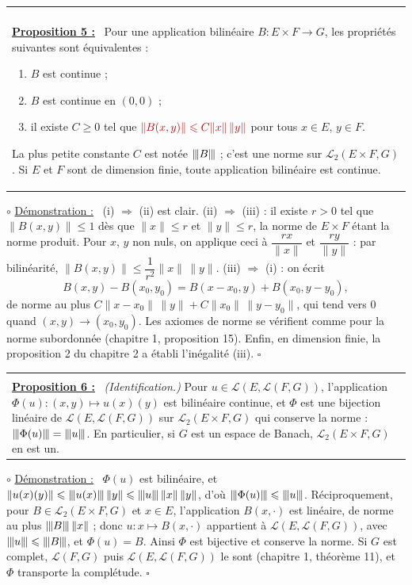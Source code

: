 \documentclass[a4paper,twoside]{report}
\makeatletter
\newcommand{\rmath}[1]{\textcolor{rougecours}{#1}}
\newenvironment{cadre}%
 {\par\vspace{2mm}\noindent\begin{tabular}{|@{\hspace{4mm}}p{0.93\textwidth}@{\hspace{4mm}}|}
  \hline \\[-2mm]}%
 {\\[2mm] \hline \end{tabular}\par\vspace{3mm}}
\newcommand{\propo}[1]{\textbf{\underline{Proposition #1 :}}~}
\newenvironment{demo}%
 {\par\needspace{4\baselineskip}\vspace{1mm}\noindent$\circ$ \underline{Démonstration :}~\setlength{\parskip}{3pt plus 1pt}}%
 {\hfill$\square$\par\vspace{2mm}}
\newcommand{\norme}[1]{\lVert #1 \rVert}         %
\newcommand{\nop}[1]{|\mkern-1.5mu|\mkern-1.5mu|#1|\mkern-1.5mu|\mkern-1.5mu|}   %
\newcommand{\Lc}{\mathcal{L}}                     %
\makeatother
\begin{document}
\begin{cadre}
\propo{5} Pour une application bilinéaire $B : E \times F \to G$, les propriétés suivantes sont équivalentes :
\begin{enumerate}[label=(\roman*),topsep=3pt,itemsep=2pt]
  \item $B$ est continue ;
  \item $B$ est continue en $(0, 0)$ ;
  \item il existe $C \geqslant 0$ tel que $\rmath{\norme{B(x, y)} \leqslant C\norme{x}\,\norme{y}}$ pour tous $x \in E$, $y \in F$.
\end{enumerate}
La plus petite constante $C$ est notée $\nop{B}$ ; c'est une norme sur $\Lc_{2}(E \times F, G)$. Si $E$ et $F$ sont de dimension finie, toute application bilinéaire est continue.
\end{cadre}

\begin{demo}
(i) $\Rightarrow$ (ii) est clair. (ii) $\Rightarrow$ (iii) : il existe $r > 0$ tel que $\norme{B(x, y)} \leqslant 1$ dès que $\norme{x} \leqslant r$ et $\norme{y} \leqslant r$, la norme de $E \times F$ étant la norme produit. Pour $x$, $y$ non nuls, on applique ceci à $\dfrac{rx}{\norme{x}}$ et $\dfrac{ry}{\norme{y}}$ : par bilinéarité, $\norme{B(x, y)} \leqslant \dfrac{1}{r^{2}}\norme{x}\,\norme{y}$. (iii) $\Rightarrow$ (i) : on écrit
\[ B(x, y) - B(x_{0}, y_{0}) = B(x - x_{0}, y) + B(x_{0}, y - y_{0}), \]
de norme au plus $C\norme{x - x_{0}}\,\norme{y} + C\norme{x_{0}}\,\norme{y - y_{0}}$, qui tend vers $0$ quand $(x, y) \to (x_{0}, y_{0})$. Les axiomes de norme se vérifient comme pour la norme subordonnée (chapitre 1, proposition 15). Enfin, en dimension finie, la proposition 2 du chapitre 2 a établi l'inégalité (iii).
\end{demo}

\begin{cadre}
\propo{6} \emph{(Identification.)} Pour $u \in \Lc(E, \Lc(F, G))$, l'application $\Phi(u) : (x, y) \mapsto u(x)(y)$ est bilinéaire continue, et $\Phi$ est une bijection linéaire de $\Lc(E, \Lc(F, G))$ sur $\Lc_{2}(E \times F, G)$ qui conserve la norme : $\nop{\Phi(u)} = \nop{u}$. En particulier, si $G$ est un espace de Banach, $\Lc_{2}(E \times F, G)$ en est un.
\end{cadre}

\begin{demo}
$\Phi(u)$ est bilinéaire, et $\norme{u(x)(y)} \leqslant \nop{u(x)}\,\norme{y} \leqslant \nop{u}\,\norme{x}\,\norme{y}$, d'où $\nop{\Phi(u)} \leqslant \nop{u}$. Réciproquement, pour $B \in \Lc_{2}(E \times F, G)$ et $x \in E$, l'application $B(x, \cdot)$ est linéaire, de norme au plus $\nop{B}\,\norme{x}$ ; donc $u : x \mapsto B(x, \cdot)$ appartient à $\Lc(E, \Lc(F, G))$, avec $\nop{u} \leqslant \nop{B}$, et $\Phi(u) = B$. Ainsi $\Phi$ est bijective et conserve la norme. Si $G$ est complet, $\Lc(F, G)$ puis $\Lc(E, \Lc(F, G))$ le sont (chapitre 1, théorème 11), et $\Phi$ transporte la complétude.
\end{demo}
\end{document}
